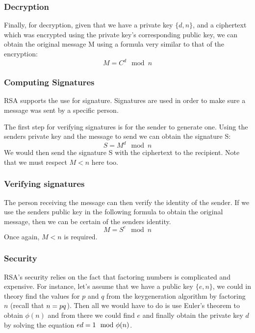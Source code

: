 \documentclass[conference]{IEEEtran}
\begin{document}
\subsubsection{Decryption}
Finally, for decryption, given that we have a private key $\{d,n\}$, and a ciphertext
which was encrypted using the private key's corresponding public key, we can obtain the original
message M using a formula very similar to that of the encryption:
\begin{equation*}
    M = C^{d}\mod n
\end{equation*}


\subsubsection{Computing Signatures}
RSA supports the use for signature. Signatures are used in order to make 
sure a message was sent by a specific person.

The first step for verifying signatures is for the sender to generate one.
Using the senders private key and the message to send we can obtain the signature
S:
\begin{equation*}
    S = M^{d}\mod n
\end{equation*}
We would then send the signature S with the ciphertext to the recipient.
Note that we must respect $M < n$ here too.


\subsubsection{Verifying signatures}
The person receiving the message can then verify the identity of the sender.
If we use the senders public key in the following formula to obtain the original
message, then we can be certain of the senders identity.
\begin{equation*}
    M = S^{e}\mod n
\end{equation*}
Once again, $M < n$ is required.


\subsubsection{Security}
RSA's security relies on the fact that factoring numbers is complicated and expensive.
For instance, let's assume that we have a public key $\{e,n\}$, we could in theory find
the values for $p$ and $q$ from the keygeneration algorithm by factoring $n$ (recall that $n = p\*q$). Then all we would have to do is 
use Euler's theorem to obtain $\phi(n)$ and from there we could find $e$ and finally 
obtain the private key $d$ by solving the equation $e\*d = 1\mod \phi(n)$.
\end{document}
